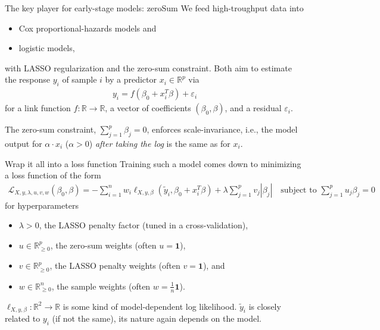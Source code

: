 \documentclass[10pt, aspectratio=169]{beamer}
\def\RR{\mathbb{R}}
\begin{document}
\begin{frame}{The key player for early-stage models: zeroSum}
  We feed high-troughput data into 

  \begin{itemize}
    \item \alert{Cox} proportional-hazards models and
    \item \alert{logistic} models,
  \end{itemize}

  with \alert{LASSO} regularization and the \alert{zero-sum} constraint. Both  
  aim to estimate the response $y_i$ of sample $i$ by a predictor $x_i \in \mathbb{R}^p$ via 
  \begin{align}
    y_i = f(\beta_0 + x_i^T \beta) + \varepsilon_i
  \end{align}
  for a link function $f: \mathbb{R} \to \mathbb{R}$, a vector of coefficients $(\beta_0, 
  \beta)$, and a residual $\varepsilon_i$.

  The zero-sum constraint, $\sum_{j=1}^p \beta_j = 0$, enforces \alert{scale-invariance}, i.e., 
  the model output for $\alpha \cdot x_i$ ($\alpha > 0$) \textit{after taking the log} is the same 
  as for $x_i$.
\end{frame}

\begin{frame}{Wrap it all into a loss function}
  Training such a model comes down to minimizing a loss function of the form 
  \begin{align}
    \mathcal{L}_{X, y, \lambda, u, v, w}(\beta_0, \beta) = -\sum_{i=1}^n w_i 
    \ell_{X, y, \beta}(\tilde{y}_i, \beta_0 + x_i^T \beta) + \lambda \sum_{j=1}^p v_j |\beta_j| 
    \quad \text{subject to } \sum_{j=1}^p u_j \beta_j = 0
  \end{align}
  for hyperparameters 
  \begin{itemize}
    \item $\lambda > 0$, the LASSO penalty factor (tuned in a cross-validation),
    \item $u \in \RR^p_{\geq 0}$, the zero-sum weights (often $u = \mathbf{1}$),
    \item $v \in \RR^p_{\geq 0}$, the LASSO penalty weights (often $v = \mathbf{1}$), and
    \item $w \in \RR^n_{\geq 0}$, the sample weights (often $w = \frac{1}{n} \mathbf{1}$).
  \end{itemize}

  $\ell_{X, y, \beta}: \RR^2 \to \RR$ is some kind of model-dependent log likelihood. $\tilde{y}_i$ 
  is closely related to $y_i$ (if not the same), its nature again depends on the model.
\end{frame}
\end{document}
